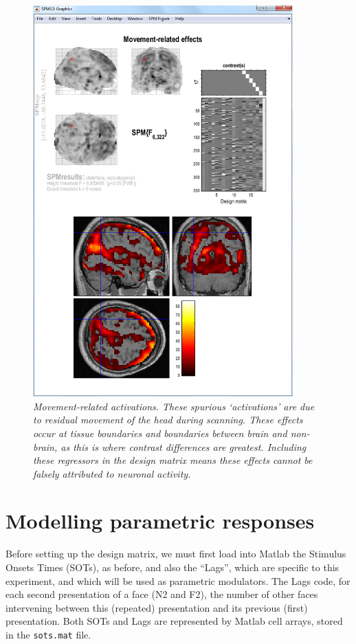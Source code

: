 \documentclass[a4paper,titlepage]{book}
\begin{document}
\begin{figure}
\begin{center}
\includegraphics[width=100mm]{faces/movements}
\caption{\em Movement-related activations. These spurious `activations' are due to residual movement of the head during scanning. These effects occur at tissue boundaries and boundaries between brain and non-brain, as this is where contrast differences are greatest. Including these regressors in the design matrix means these effects cannot be falsely attributed 
to neuronal activity. \label{movements} }
\end{center}
\end{figure}


\section{Modelling parametric responses}


Before setting up the design matrix, we must first 
load into Matlab the Stimulus Onsets Times (SOTs), as before, and also the ``Lags'', which are specific to this experiment, and which will be used as parametric modulators. The Lags code, for each second presentation of a face (N2 and F2), the number of other faces intervening between this (repeated) presentation and its previous (first) presentation. Both SOTs and Lags are represented by Matlab cell arrays, stored in the \verb!sots.mat! file.
\end{document}
